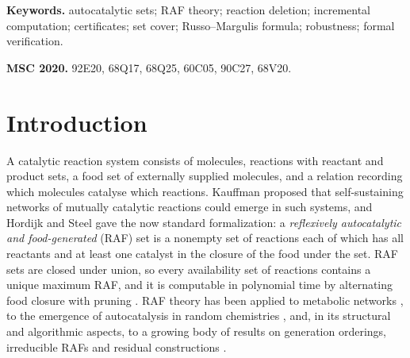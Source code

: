 \documentclass[11pt,a4paper]{article}
\theoremstyle{plain}
\theoremstyle{definition}
\theoremstyle{remark}
\begin{document}
\noindent\textbf{Keywords.} autocatalytic sets; RAF theory; reaction deletion; incremental computation; certificates; set cover; Russo--Margulis formula; robustness; formal verification.

\medskip
\noindent\textbf{MSC 2020.} 92E20, 68Q17, 68Q25, 60C05, 90C27, 68V20.

\section{Introduction}\label{sec:intro}

A catalytic reaction system consists of molecules, reactions with reactant and product sets, a food set of externally supplied molecules, and a relation recording which molecules catalyse which reactions. Kauffman \citep{kauffman1986} proposed that self-sustaining networks of mutually catalytic reactions could emerge in such systems, and Hordijk and Steel \citep{hordijk2004} gave the now standard formalization: a \emph{reflexively autocatalytic and food-generated} (RAF) set is a nonempty set of reactions each of which has all reactants and at least one catalyst in the closure of the food under the set. RAF sets are closed under union, so every availability set of reactions contains a unique maximum RAF, and it is computable in polynomial time by alternating food closure with pruning \citep{hordijk2004,hordijk2015}. RAF theory has been applied to metabolic networks \citep{sousa2015}, to the emergence of autocatalysis in random chemistries \citep{hordijk2017}, and, in its structural and algorithmic aspects, to a growing body of results on generation orderings, irreducible RAFs and residual constructions \citep{steel2020,huson2024}.
\end{document}
